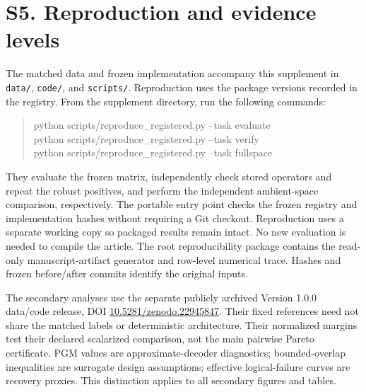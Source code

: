 \documentclass[10pt]{article}
\newcommand{\suppsection}[1]{\section*{#1}}
\begin{document}
\suppsection{S5. Reproduction and evidence levels}
The matched data and frozen implementation accompany this supplement in \texttt{data/}, \texttt{code/}, and \texttt{scripts/}. Reproduction uses the package versions recorded in the registry. From the supplement directory, run the following commands:
\begin{quote}\small\ttfamily
python scripts/reproduce\_registered.py --task evaluate\\
python scripts/reproduce\_registered.py --task verify\\
python scripts/reproduce\_registered.py --task fullspace
\end{quote}
They evaluate the frozen matrix, independently check stored operators and repeat the robust positives, and perform the independent ambient-space comparison, respectively. The portable entry point checks the frozen registry and implementation hashes without requiring a Git checkout. Reproduction uses a separate working copy so packaged results remain intact. No new evaluation is needed to compile the article. The root reproducibility package contains the read-only manuscript-artifact generator and row-level numerical trace. Hashes and frozen before/after commits identify the original inputs.

The secondary analyses use the separate publicly archived Version 1.0.0 data/code release, DOI \href{https://doi.org/10.5281/zenodo.22945847}{10.5281/zenodo.22945847}. Their fixed references need not share the matched labels or deterministic architecture. Their normalized margins test their declared scalarized comparison, not the main pairwise Pareto certificate. PGM values are approximate-decoder diagnostics; bounded-overlap inequalities are surrogate design assumptions; effective logical-failure curves are recovery proxies. This distinction applies to all secondary figures and tables.




\FloatBarrier


\end{document}
